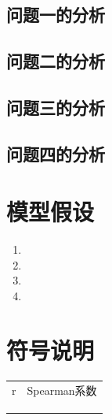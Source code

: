 \documentclass[a4paper]{article}
\begin{document}
	\subsection{问题一的分析}






	\subsection{问题二的分析}
	
	
	\subsection{问题三的分析}
	\subsection{问题四的分析}
	
	\section{模型假设}
	\begin{enumerate} 
		\item 
		\item 
		\item 
		\item 
	\end{enumerate}
	
	\section{符号说明}
	\begin{table}[H] %
		\captionsetup{skip=4pt} %
		\centering
		\setlength{\arrayrulewidth}{2pt} %
		\begin{tabular}{cc} %
			\hline
			\makebox[0.15\textwidth][c]{符号} & \makebox[0.6\textwidth][c]{说明}  \\ 
			\hline
			r & Spearman系数  \\
			 &   \\
			 &   \\
			 &   \\
			\hline
		\end{tabular}
	\end{table}
	
\end{document}
